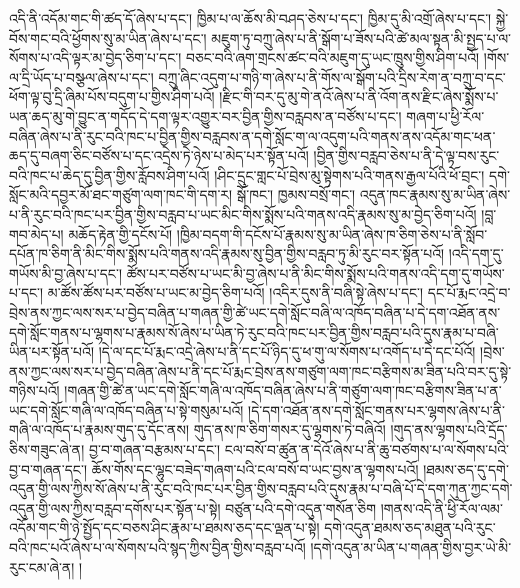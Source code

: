 འདི་ནི་འདོམ་གང་གི་ཚད་དོ་ཞེས་པ་དང་། ཁྱིམ་པ་ལ་ཆོས་མི་བཤད་ཅེས་པ་དང་། ཁྱིམ་དུ་མི་འགྲོ་ཞེས་པ་དང་། སྐྱེ་བོས་གང་བའི་ཕྱོགས་སུ་མ་ཡིན་ཞེས་པ་དང་། མཇུག་ཏུ་བཀྲུ་ཞེས་པ་ནི་སྒོག་པ་ཟོས་པའི་ཚེ་མལ་སྟན་མི་སྤྱད་པ་ལ་སོགས་པ་འདི་ལྟར་མ་བྱེད་ཅིག་པ་དང་། བཅང་བའི་ཞག་གྲངས་ཚང་བའི་མཇུག་དུ་ཡང་ཁྲུས་གྱིས་ཤིག་པའོ། །གོས་ལ་དྲི་ཡོད་པ་བསྩལ་ཞེས་པ་དང་། བཀྲུ་ཞིང་འདུག་པ་གཉི་ག་ཞེས་པ་ནི་གོས་ལ་སྒོག་པའི་དྲིས་རེག་ན་བཀྲུ་བ་དང་ཕོག་ལྟ་བུ་དྲི་ཞིམ་པོས་བདུག་པ་གྱིས་ཤིག་པའོ། །རྫིང་གི་བར་དུ་མུ་གེ་ནའོ་ཞེས་པ་ནི་འོག་ནས་རྫིང་ཞེས་སྨོས་པ་ཡན་ཆད་མུ་གེ་བྱུང་ན་གདོད་དེ་དག་ལྟར་འགྱུར་བར་བྱིན་གྱིས་བརླབས་ན་བཙོས་པ་དང་། གཞག་པ་ཕྱི་རོལ་བཞིན་ཞེས་པ་ནི་རུང་བའི་ཁང་པ་བྱིན་གྱིས་བརླབས་ན་དགེ་སློང་ག་ལ་འདུག་པའི་གནས་ནས་འདོམ་གང་ཕན་ཆད་དུ་བཞག་ཅིང་བཙོས་པ་དང་འདྲེས་ཏེ་ཉེས་པ་མེད་པར་སྟོན་པའོ། །བྱིན་གྱིས་བརླབ་ཅེས་པ་ནི་དེ་ལྟ་བས་རུང་བའི་ཁང་པ་ཆེད་དུ་བྱིན་གྱིས་རློབས་ཤིག་པའོ། །ཤིང་དྲུང་གླང་པོ་བྲེས་མུ་སྟེགས་པའི་གནས་རྒྱལ་པོའི་ཕོ་བྲང་། དགེ་སློང་མའི་དབྱར་མོ་ཐང་གཙུག་ལག་ཁང་གི་དག་ར། སྒོ་ཁང་། ཁྱམས་བསྲོ་གང་། འདུན་ཁང་རྣམས་སུ་མ་ཡིན་ཞེས་པ་ནི་རུང་བའི་ཁང་པར་བྱིན་གྱིས་བརླབ་པ་ཡང་མིང་གིས་སྨོས་པའི་གནས་འདི་རྣམས་སུ་མ་བྱེད་ཅིག་པའོ། །བླ་གབ་མེད་པ། མཆོད་རྟེན་གྱི་དངོས་པོ། །ཁྱིམ་བདག་གི་དངོས་པོ་རྣམས་སུ་མ་ཡིན་ཞེས་ཁ་ཅིག་ཅེས་པ་ནི་སློབ་དཔོན་ཁ་ཅིག་ནི་མིང་གིས་སྨོས་པའི་གནས་འདི་རྣམས་སུ་བྱིན་གྱིས་བརླབ་ཏུ་མི་རུང་བར་སྟོན་པའོ། །འདི་དག་དུ་གཡོས་མི་བྱ་ཞེས་པ་དང་། ཚོས་པར་བཙོས་པ་ཡང་མི་བྱ་ཞེས་པ་ནི་མིང་གིས་སྨོས་པའི་གནས་འདི་དག་དུ་གཡོས་པ་དང་། མ་ཚོས་ཚོས་པར་བཙོས་པ་ཡང་མ་བྱེད་ཅིག་པའོ། །འདིར་དུས་ནི་བཞི་སྟེ་ཞེས་པ་དང་། དང་པོ་རྨང་འདྲེ་བ་བྲེས་ནས་ཀྱང་ལས་སར་པ་བྱེད་བཞིན་པ་གཞན་གྱི་ཚེ་ཡང་དགེ་སློང་བཞི་ལ་འཁོད་བཞིན་པ་དེ་དག་འཐོན་ནས་དགེ་སློང་གནས་པ་ལྷགས་པ་རྣམས་སོ་ཞེས་པ་ཡིན་ཏེ་རུང་བའི་ཁང་པར་བྱིན་གྱིས་བརླབ་པའི་དུས་རྣམ་པ་བཞི་ཡིན་པར་སྟོན་པའོ། །དེ་ལ་དང་པོ་རྨང་འདྲེ་ཞེས་པ་ནི་དང་པོ་ཉིད་དུ་ཕ་གུ་ལ་སོགས་པ་འགོད་པ་དེ་དང་པོའོ། །བྲེས་ནས་ཀྱང་ལས་སར་པ་བྱེད་བཞིན་ཞེས་པ་ནི་དང་པོ་རྨང་བྲེས་ནས་གཙུག་ལག་ཁང་བརྩིགས་མ་ཟིན་པའི་བར་དུ་སྟེ་གཉིས་པའོ། །གཞན་གྱི་ཚེ་ན་ཡང་དགེ་སློང་གཞི་ལ་འཁོད་བཞིན་ཞེས་པ་ནི་གཙུག་ལག་ཁང་བརྩིགས་ཟིན་པ་ན་ཡང་དགེ་སློང་གཞི་ལ་འཁོད་བཞིན་པ་སྟེ་གསུམ་པའོ། །དེ་དག་འཐོན་ནས་དགེ་སློང་གནས་པར་ལྷགས་ཞེས་པ་ནི་གཞི་ལ་འཁོད་པ་རྣམས་གུད་དུ་དོང་ནས། གུད་ནས་ཁ་ཅིག་གསར་དུ་ལྷགས་ཏེ་བཞིའོ། །གུད་ནས་ལྷགས་པའི་དྲོད་ཅིས་གཟུང་ཞེ་ན། བྱ་བ་གཞན་བརྩམས་པ་དང་། ངལ་བསོ་བ་ཚུན་ན་དེའོ་ཞེས་པ་ནི་ཆུ་བཙགས་པ་ལ་སོགས་པའི་བྱ་བ་གཞན་དང་། ཆོས་གོས་དང་ལྷུང་བཟེད་གཞག་པའི་ངལ་བསོ་བ་ཡང་བྱས་ན་ལྷགས་པའོ། །ཐམས་ཅད་དུ་དགེ་འདུན་གྱི་ལས་ཀྱིས་སོ་ཞེས་པ་ནི་རུང་བའི་ཁང་པར་བྱིན་གྱིས་བརླབ་པའི་དུས་རྣམ་པ་བཞི་པོ་དེ་དག་ཀུན་ཀྱང་དགེ་འདུན་གྱི་ལས་ཀྱིས་བརླབ་དགོས་པར་སྟོན་པ་སྟེ། བཙུན་པའི་དགེ་འདུན་གསོན་ཅིག །གནས་འདི་ནི་ཕྱི་རོལ་ལམ་འདོམ་གང་གི་ཉེ་སྤྱོད་དང་བཅས་ཤིང་རྣམ་པ་ཐམས་ཅད་དང་ལྡན་པ་སྟེ། དགེ་འདུན་ཐམས་ཅད་མཐུན་པའི་རུང་བའི་ཁང་པའོ་ཞེས་པ་ལ་སོགས་པའི་སྙད་ཀྱིས་བྱིན་གྱིས་བརླབ་པའོ། །དགེ་འདུན་མ་ཡིན་པ་གཞན་གྱིས་བྱར་ཡེ་མི་རུང་ངམ་ཞེ་ན། །
